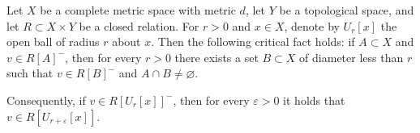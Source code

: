 \begin{lemma}
Let $X$ be a complete metric space with metric $d$, let $Y$ be a topological space, and let $R \subset X \times Y$ be a closed relation. For $r > 0$ and $x \in X$, denote by $U_r[x]$ the open ball of radius $r$ about $x$. Then the following critical fact holds: if $A \subset X$ and $v \in R[A]^{-}$, then for every $r > 0$ there exists a set $B \subset X$ of diameter less than $r$ such that $v \in R[B]^{-}$ and $A \cap B \neq \varnothing$.

Consequently, if $v \in R[U_r[x]]^{-}$, then for every $\varepsilon > 0$ it holds that $v \in R[U_{r+\varepsilon}[x]]$.
\end{lemma}
